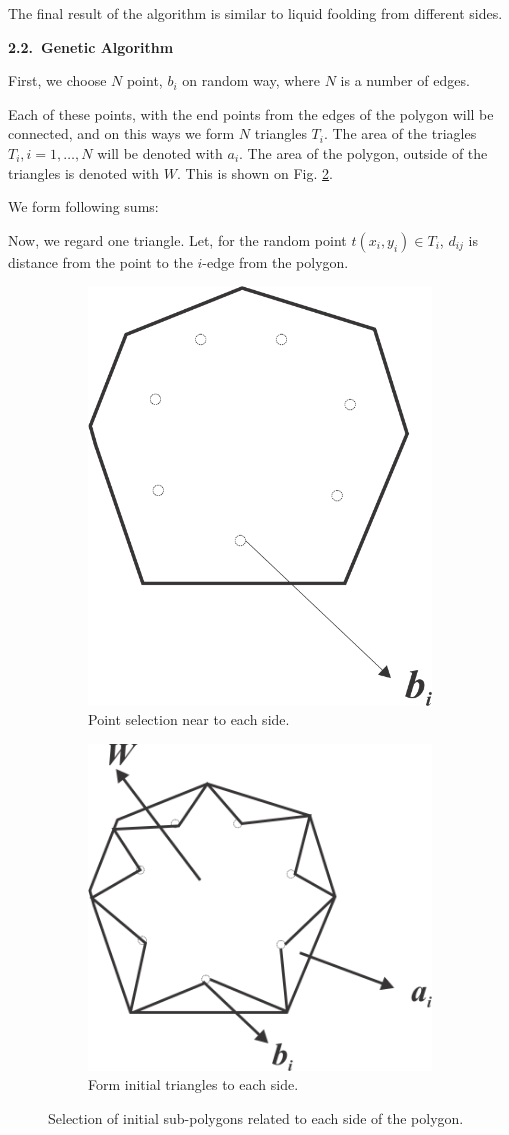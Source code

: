 \documentclass[11pt,leqno]{book}
\newcommand{\subsect}[1]{\vskip 3mm\par{\bf#1}}
\begin{document}
The final result of the algorithm is similar to liquid foolding from different sides.

\subsect{2.2.~Genetic Algorithm}

First, we choose $N$ point, $b_i$  on random way, where $N$ is a number of edges.

Each of these points, with the end points from the edges of the polygon will be connected, and on this ways we form $N$ triangles  $T_i$. The area of the triagles $T_i, i=1, \ldots, N $ will be denoted with $a_i$. The area of the polygon, outside of the triangles is denoted with $W$.  This is shown on Fig. \ref{fig:sub6}.

We form following sums:

Now, we regard one triangle.  Let, for the random point $t(x_i, y_i) \in T_i$,  $d_{ij}$  is distance from the point to the $i$-edge from the polygon. 

\begin{figure}[h!]
\centering
\begin{subfigure}{.5\textwidth}
  \centering
  \includegraphics[width=.5\linewidth]{pic04.png}
  \caption{Point selection near to each side.}
  \label{fig:sub5}
\end{subfigure}%
\begin{subfigure}{.5\textwidth}
  \centering
  \includegraphics[width=.6\linewidth]{pic05.png}
  \caption{Form initial triangles to each side.}
  \label{fig:sub6}
\end{subfigure}
\caption{Selection of initial sub-polygons related to each side of the polygon.}
\label{fig:three}
\end{figure}
\end{document}
